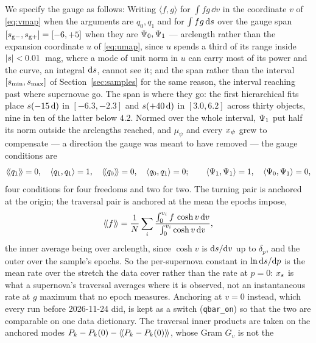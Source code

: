\documentclass[11pt]{article}
\theoremstyle{plain}
\begin{document}
We specify the gauge as follows:
Writing $\langle f,g\rangle$ for $\int fg\,\dd v$ in the
coordinate $v$ of \eqref{eq:vmap} when the arguments are $q_{0}, q_{1}$ and for
$\int fg\,\mathrm{d}s$ over the gauge span $[s_{\mathrm{g}-}, s_{\mathrm{g}+}] = [-6, +5]$
when they are $\Psi_{0}, \Psi_{1}$ ---
arclength rather than the expansion coordinate $u$ of \eqref{eq:umap}, since $u$ spends a
third of its range inside $|s| < 0.01$~mag, where a mode of unit norm in $u$ can carry
most of its power and the curve, an integral $\mathrm{d}s$, cannot see it; and the span rather
than the interval $[s_{\min}, s_{\max}]$ of Section~\ref{sec:samples} for the same reason,
the interval reaching past where supernovae go. The span is where they go: the first
hierarchical fits place $s(-15\,\mathrm{d})$ in $[-6.3, -2.3]$ and $s(+40\,\mathrm{d})$
in $[3.0, 6.2]$ across thirty objects, nine in ten of the latter below $4.2$. Normed over the
whole interval, $\Psi_{1}$ put half its norm outside the arclengths reached, and $\mu_{\psi}$
and every $x_{\psi}$ grew to compensate --- a direction the gauge was meant to have
removed --- the gauge conditions are
\begin{equation}
  \left\langle\!\left\langle q_{1} \right\rangle\!\right\rangle = 0, \quad \langle q_{1},q_{1}\rangle = 1, \quad
  \left\langle\!\left\langle q_{0} \right\rangle\!\right\rangle = 0, \quad \langle q_{0},q_{1}\rangle = 0;
  \qquad
  \langle \Psi_{1},\Psi_{1}\rangle = 1, \quad
  \langle \Psi_{0},\Psi_{1}\rangle = 0 ,
  \label{eq:gauge}
\end{equation}
four conditions for four freedoms and two for two. The turning pair is anchored at the
origin; the traversal pair is anchored at the mean the epochs impose,
\begin{equation}
  \left\langle\!\left\langle f \right\rangle\!\right\rangle = \frac{1}{N}\sum_{i}
    \frac{\int_{0}^{v_{i}} f\,\cosh v\,\mathrm{d} v}{\int_{0}^{v_{i}} \cosh v\,\mathrm{d} v} ,
  \label{eq:qbar}
\end{equation}
the inner average being over arclength, since $\cosh v$ is $\mathrm{d}s/\mathrm{d} v$ up to
$\delta_{p}$, and the outer over the sample's epochs. So the per-supernova constant in
$\ln \mathrm{d}s/\mathrm{d} p$ is the mean rate over the stretch the data cover rather than the rate at
$p = 0$: $x_{s}$ is what a supernova's traversal averages where it is observed, not an
instantaneous rate at $g$ maximum that no epoch measures. Anchoring at $v = 0$ instead,
which every run before 2026-11-24 did, is kept as a switch (\texttt{qbar\_on}) so that the
two are comparable on one data dictionary. The traversal inner products are taken on the
anchored modes $P_{k} - P_{k}(0) - \left\langle\!\left\langle P_{k} - P_{k}(0) \right\rangle\!\right\rangle$, whose Gram $G_{v}$ is not the
\end{document}
